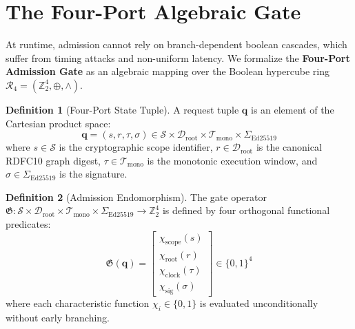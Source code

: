 \documentclass[12pt,oneside,a4paper]{book}
\theoremstyle{definition}
\newtheorem{definition}{Definition}[chapter]
\theoremstyle{plain}
\theoremstyle{remark}
\begin{document}
\section{The Four-Port Algebraic Gate}
At runtime, admission cannot rely on branch-dependent boolean cascades, which suffer from timing attacks and non-uniform latency. We formalize the \textbf{Four-Port Admission Gate} as an algebraic mapping over the Boolean hypercube ring $\mathcal{R}_4 = (\mathbb{Z}_2^4, \oplus, \wedge)$.

\begin{definition}[Four-Port State Tuple]
A request tuple $\mathbf{q}$ is an element of the Cartesian product space:
\begin{equation}
    \mathbf{q} = (s, r, \tau, \sigma) \in \mathcal{S} \times \mathcal{D}_{\text{root}} \times \mathcal{T}_{\text{mono}} \times \Sigma_{\text{Ed25519}}
\end{equation}
where $s \in \mathcal{S}$ is the cryptographic scope identifier, $r \in \mathcal{D}_{\text{root}}$ is the canonical RDFC10 graph digest, $\tau \in \mathcal{T}_{\text{mono}}$ is the monotonic execution window, and $\sigma \in \Sigma_{\text{Ed25519}}$ is the signature.
\end{definition}

\begin{definition}[Admission Endomorphism]
The gate operator $\mathfrak{G}: \mathcal{S} \times \mathcal{D}_{\text{root}} \times \mathcal{T}_{\text{mono}} \times \Sigma_{\text{Ed25519}} \to \mathbb{Z}_2^4$ is defined by four orthogonal functional predicates:
\begin{equation}
    \mathfrak{G}(\mathbf{q}) = \begin{bmatrix}
        \chi_{\text{scope}}(s) \\
        \chi_{\text{root}}(r) \\
        \chi_{\text{clock}}(\tau) \\
        \chi_{\text{sig}}(\sigma)
    \end{bmatrix} \in \{0, 1\}^4
\end{equation}
where each characteristic function $\chi_i \in \{0, 1\}$ is evaluated unconditionally without early branching.
\end{definition}
\end{document}
